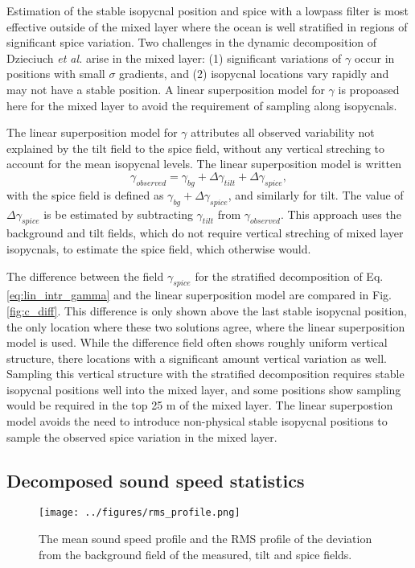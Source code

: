 \documentclass[preprint,NumberedRefs]{JASA}
\begin{document}
Estimation of the stable isopycnal position and spice with a lowpass filter is most effective outside of the mixed layer where the ocean is well stratified in regions of significant spice variation. Two challenges in the dynamic decomposition of Dzieciuch \emph{et al.}\citep{dzieciuch2004} arise in the mixed layer: (1) significant variations of $\gamma$ occur in positions with small $\sigma$ gradients, and (2) isopycnal locations vary rapidly and may not have a stable position. A linear superposition model for $\gamma$ is propoased here for the mixed layer to avoid the requirement of sampling along isopycnals.

The linear superposition model for $\gamma$ attributes all observed variability not explained by the tilt field to the spice field, without any vertical streching to account for the mean isopycnal levels. The linear superposition model is written
\begin{equation}
    \gamma_{observed} = \gamma_{bg} + \Delta \gamma_{tilt} + \Delta \gamma_{spice},
    \label{eq:lin_sup}
\end{equation}
with the spice field is defined as $\gamma_{bg} + \Delta \gamma_{spice}$, and similarly for tilt. The value of $\Delta \gamma_{spice}$ is be estimated by subtracting $\gamma_{tilt}$ from $\gamma_{observed}$. This approach uses the background and tilt fields, which do not require vertical streching of mixed layer isopycnals, to estimate the spice field, which otherwise would.

The difference between the field $\gamma_{spice}$ for the stratified decomposition of Eq. \eqref{eq:lin_intr_gamma} and the linear superposition model are compared in Fig. \ref{fig:c_diff}. This difference is only shown above the last stable isopycnal position, the only location where these two solutions agree, where the linear superposition model is used. While the difference field often shows roughly uniform vertical structure, there locations with a significant amount vertical variation as well. Sampling this vertical structure with the stratified decomposition requires stable isopycnal positions well into the mixed layer, and some positions show sampling would be required in the top 25 m of the mixed layer. The linear superpostion model avoids the need to introduce non-physical stable isopycnal positions to sample the observed spice variation in the mixed layer.

\subsection{Decomposed sound speed statistics}
\begin{figure}
\texttt{[image: ../figures/rms\_profile.png]}
    \caption{\label{fig:c_rms}{The mean sound speed profile and the RMS profile of the deviation from the background field of the measured, tilt and spice fields. }}
\end{figure}
\end{document}
